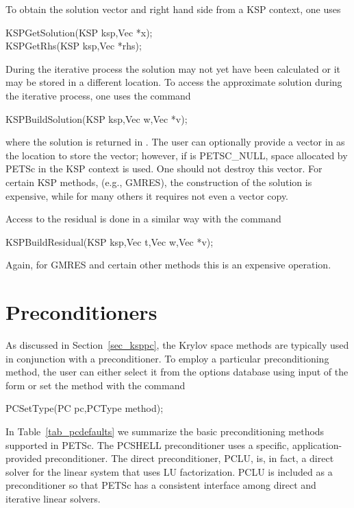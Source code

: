 To obtain the solution vector and right hand side from a KSP 
context, one uses 
\begin{tabbing}
  KSPGetSolution(KSP ksp,Vec *x);\\
  KSPGetRhs(KSP ksp,Vec *rhs);
\end{tabbing}
During the iterative process
the solution may not yet have been calculated or it may be stored in 
a different location. To access the approximate solution during the 
iterative process, one uses the command 
\begin{tabbing}
  KSPBuildSolution(KSP ksp,Vec w,Vec *v);
\end{tabbing}
where the solution is returned in . The user can optionally provide
a vector in  as the location to store the vector; however, if 
 is PETSC_NULL, space allocated by PETSc in the KSP context is 
used. One should not destroy this vector. For certain KSP methods, 
(e.g., GMRES), the construction of the solution is expensive, while for many 
others it requires not even a vector copy. 

Access to the residual is done in a similar way with the 
command 
\begin{tabbing}
  KSPBuildResidual(KSP ksp,Vec t,Vec w,Vec *v);
\end{tabbing}
Again, for GMRES and certain other methods this is an expensive 
operation.

\section{Preconditioners} 
\label{sec_pc}

As discussed in Section~\ref{sec_ksppc}, the Krylov space methods are
typically used in conjunction with a preconditioner.
To employ a particular preconditioning method, the user can either select 
it from the options database using input of the form 
 or set the method with the 
command 
\begin{tabbing}
  PCSetType(PC pc,PCType method);
\end{tabbing}
In Table~\ref{tab_pcdefaults} we summarize the basic
preconditioning methods supported in PETSc.
The PCSHELL preconditioner uses a specific,
application-provided preconditioner.  The direct preconditioner, PCLU,
is, in fact, a direct solver for the linear system that uses LU
factorization. PCLU is included as a preconditioner so that PETSc has a
consistent interface among direct and iterative linear solvers.

